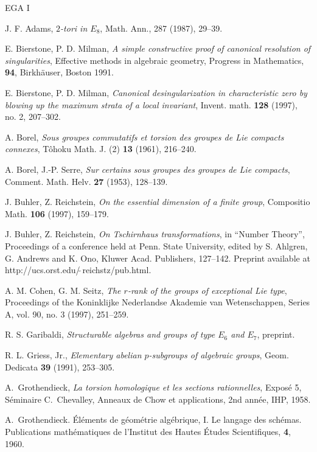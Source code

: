 \begin{thebibliography}{EGA I}

J. F. Adams, {\em $2$-tori in $E_8$}, Math. Ann., 
287 (1987), 29--39.

E. Bierstone, P. D. Milman, {\em A simple constructive proof
of canonical resolution of singularities}, Effective methods in algebraic
geometry, Progress in Mathematics, {\bf 94}, Birkh\"auser, Boston 1991.

E. Bierstone, P. D. Milman, {\em Canonical 
desingularization in characteristic zero by blowing up the maximum 
strata of a local invariant}, Invent. math. {\bf 128} (1997), no. 2, 207--302.

A. Borel, {\em Sous groupes commutatifs et torsion 
des groupes de Lie compacts connexes}, T\^ohoku Math. J. (2) {\bf 13} (1961),
216--240.

A. Borel, J.-P. Serre, {\em Sur certains sous groupes 
des groupes de Lie compacts}, Comment. Math. Helv. {\bf 27} (1953), 128--139.

J. Buhler, Z. Reichstein, {\em On the essential
dimension of a finite group}, Compositio Math. {\bf 106} (1997), 159--179.

J. Buhler, Z. Reichstein, {\em On Tschirnhaus
transformations}, in ``Number Theory'', Proceedings of a conference
held at Penn. State University, edited by S. Ahlgren, G. Andrews 
and K. Ono, Kluwer Acad. Publishers, 127--142.
Preprint available at
http://ucs.orst.edu/$\tilde{\;}$reichstz/pub.html. 

A. M. Cohen, G. M. Seitz, {\em The $r$-rank of the groups of
exceptional Lie type}, Proceedings of the Koninklijke Nederlandse Akademie
van Wetenschappen, Series A, vol. 90, no. 3 (1997), 251--259.

R. S. Garibaldi, {\em Structurable algebras and groups 
of type $E_6$ and $E_7$}, preprint.

R. L. Griess, Jr., {\em Elementary abelian $p$-subgroups
of algebraic groups}, Geom. Dedicata {\bf 39} (1991), 253--305.

A.~Grothendieck, {\em La torsion homologique et
les sections rationnelles}, Expos\'{e} 5, S\'eminaire C.~Chevalley, 
Anneaux de Chow et applications, 2nd ann\'{e}e, IHP, 1958.

A.~Grothendieck. \'El\'ements de g\'eom\'etrie alg\'ebrique, I.
Le langage des sch\'emas.
Publications math\'ematiques de l'Institut des Hautes \'Etudes Scientifiques,
{\bf 4}, 1960.


\end{thebibliography}

